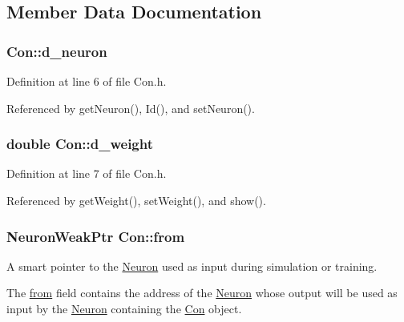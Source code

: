 \subsection{Member Data Documentation}
\hypertarget{class_con_aad857bd289343ecff2153acc852f34f0}{
\subsubsection[{d\_\-neuron}]{ {\bf Con::d\_\-neuron}}}
\label{class_con_aad857bd289343ecff2153acc852f34f0}


Definition at line 6 of file Con.h.



Referenced by getNeuron(), Id(), and setNeuron().

\hypertarget{class_con_a41e043e0dfb126f3bdacbbd8caf33672}{
\subsubsection[{d\_\-weight}]{\setlength{\rightskip}{0pt plus 5cm}double {\bf Con::d\_\-weight}}}
\label{class_con_a41e043e0dfb126f3bdacbbd8caf33672}


Definition at line 7 of file Con.h.



Referenced by getWeight(), setWeight(), and show().

\hypertarget{class_con_a7c05f90dff56fd26c1fa0f042bba67a6}{
\subsubsection[{from}]{\setlength{\rightskip}{0pt plus 5cm}NeuronWeakPtr {\bf Con::from}}}
\label{class_con_a7c05f90dff56fd26c1fa0f042bba67a6}


A smart pointer to the \hyperlink{class_neuron}{Neuron} used as input during simulation or training. 

The \hyperlink{class_con_a7c05f90dff56fd26c1fa0f042bba67a6}{from} field contains the address of the \hyperlink{class_neuron}{Neuron} whose output will be used as input by the \hyperlink{class_neuron}{Neuron} containing the \hyperlink{class_con}{Con} object. 

